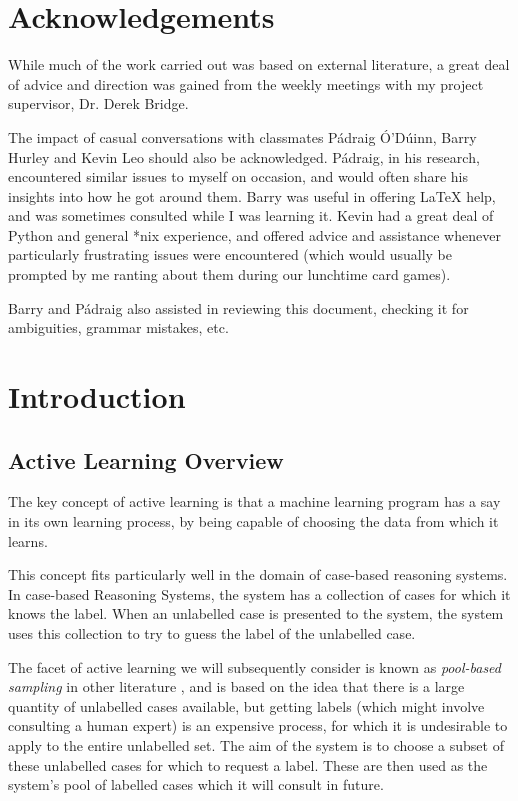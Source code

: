 \documentclass[a4paper,11pt]{report}
\begin{document}
\chapter*{Acknowledgements}
While much of the work carried out was based on external literature, a great deal of advice and direction was gained from the weekly meetings with my project supervisor, Dr. Derek Bridge.

The impact of casual conversations with classmates P\'{a}draig \'{O}'D\'uinn, Barry Hurley and Kevin Leo should also be acknowledged. P\'{a}draig, in his research, encountered similar issues to myself on occasion, and would often share his insights into how he got around them. Barry was useful in offering \LaTeX{} help, and was sometimes consulted while I was learning it. Kevin had a great deal of Python and general *nix experience, and offered advice and assistance whenever particularly frustrating issues were encountered (which would usually be prompted by me ranting about them during our lunchtime card games).

Barry and P\'{a}draig also assisted in reviewing this document, checking it for ambiguities, grammar mistakes, etc.

\tableofcontents

\chapter{Introduction}
\section{Active Learning Overview}
The key concept of active learning is that a machine learning program has a say in its own learning process, by being capable of choosing the data from which it learns. 

This concept fits particularly well in the domain of case-based reasoning systems. In case-based Reasoning Systems, the system has a collection of cases for which it knows the label. When an unlabelled case is presented to the system, the system uses this collection to try to guess the label of the unlabelled case.

The facet of active learning we will subsequently consider is known as \emph{pool-based sampling} in other literature \citep{Settles2010}, and is based on the idea that there is a large quantity of unlabelled cases available, but getting labels (which might involve consulting a human expert) is an expensive process, for which it is undesirable to apply to the entire unlabelled set. The aim of the system is to choose a subset of these unlabelled cases for which to request a label. These are then used as the system's pool of labelled cases which it will consult in future.
\end{document}
